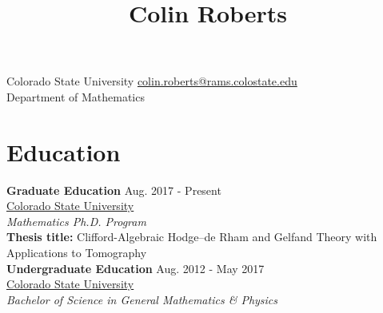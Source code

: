 \documentclass[12pt]{article} %
\begin{document}

\title{Colin Roberts} %


\begin{flushleft}
Colorado State University \hfill \href{mailto:colin.roberts@rams.colostate.edu}{colin.roberts@rams.colostate.edu}\\
Department of Mathematics \hfill %
\end{flushleft}
\noindent\makebox[\textwidth]{\rule{\textwidth}{0.5mm}}




\section{Education}

\begin{flushleft}
\textbf{Graduate Education} \hfill Aug. 2017 - Present\\
\href{http://www.colosate.edu}{Colorado State University} \hfill \\
\emph{Mathematics Ph.D. Program}\\
\vspace*{5pt}
\textbf{Thesis title:} Clifford-Algebraic Hodge--de Rham and Gelfand Theory with Applications to Tomography\\

\vspace*{10pt}
\textbf{Undergraduate Education} \hfill Aug. 2012 - May 2017\\
\href{http://www.colostate.edu}{Colorado State University}\\
\emph{Bachelor of Science in General Mathematics \& Physics}
\end{flushleft}
\noindent\makebox[\textwidth]{\rule{\textwidth}{0.5mm}}
\end{document}
